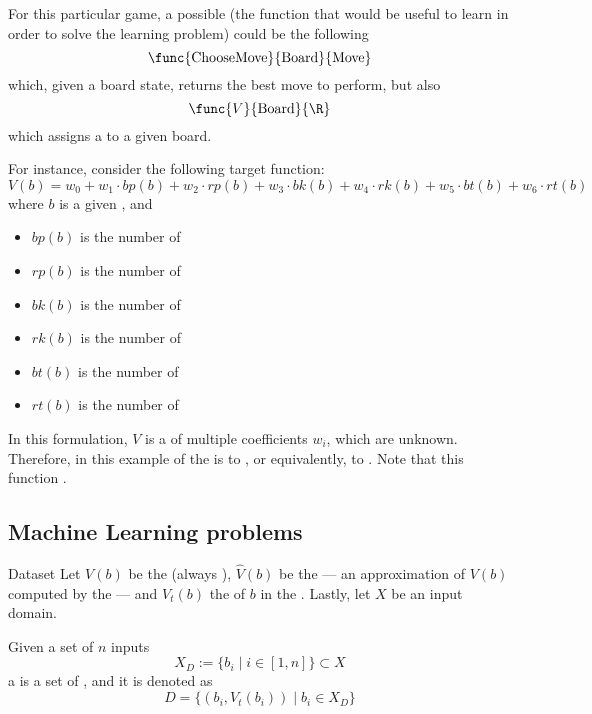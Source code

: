 \documentclass[a4paper, 12pt]{report}
\begin{document}
    For this particular game, a possible  (the function that would be useful to learn in order to solve the learning problem) could be the following $$\func{\mathrm{ChooseMove}}{\mathrm{Board}}{\mathrm{Move}}$$ which, given a board state, returns the best move to perform, but also $$\func{V}{\mathrm{Board}}{\R}$$ which assigns a  to a given board.

    For instance, consider the following target function: $$V(b) = w_0 + w_1 \cdot bp(b) + w_2 \cdot rp(b) + w_3 \cdot bk(b) + w_4 \cdot rk(b) + w_5 \cdot bt(b) + w_6 \cdot rt(b)$$ where $b$ is a given , and

    \begin{itemize}
        \item $bp(b)$ is the number of 
        \item $rp(b)$ is the number of 
        \item $bk(b)$ is the number of 
        \item $rk(b)$ is the number of 
        \item $bt(b)$ is the number of 
        \item $rt(b)$ is the number of 
    \end{itemize}

    In this formulation, $V$ is a  of multiple coefficients $w_i$, which are unknown. Therefore, in this example  of the  is to , or equivalently, to . Note that this function .
    
    \subsection{Machine Learning problems}

    \begin{frameddefn}{Dataset}
        Let $V(b)$ be the  (always ), $\hat V(b)$ be the  --- an approximation of $V(b)$ computed by the  --- and $V_t(b)$ the  of $b$ in the . Lastly, let $X$ be an input domain.

        Given a set of $n$ inputs $$X_D := \{b_i \mid i \in [1, n]\} \subset X$$ a  is a set of , and it is denoted as $$D = \{(b_i, V_t(b_i)) \mid b_i \in X_D\}$$
    \end{frameddefn}
\end{document}

